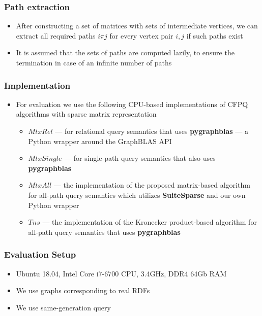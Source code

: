 \documentclass[xcolor=table,aspectratio=169]{beamer}
\begin{document}
\begin{frame}[fragile] \frametitle{Path extraction}

\begin{itemize}
	\item After constructing a set of matrices with sets of intermediate vertices, we can extract all required paths $i\pi j$ for every vertex pair $i, j$ if such paths exist
	\item It is	assumed that the sets of paths are computed lazily, to ensure the	termination in case of an infinite number of paths
	
\end{itemize}
\end{frame}


\begin{frame}[fragile] \frametitle{Implementation}

\begin{itemize}
	\item For evaluation we use the following CPU-based implementations of CFPQ algorithms with sparse matrix representation
	\begin{itemize}
		\item \textbf{$MtxRel$} --- for  relational query semantics that uses \textbf{pygraphblas} --- a Python wrapper around the GraphBLAS API
		\item \textbf{$MtxSingle$} --- for  single-path query semantics that also uses \textbf{pygraphblas}
		\item \textbf{$MtxAll$} --- the implementation of the proposed matrix-based algorithm for all-path query semantics which utilizes \textbf{SuiteSparse} and our own Python wrapper
		\item \textbf{$Tns$} --- the implementation of the Kronecker product-based algorithm for all-path query semantics that uses \textbf{pygraphblas}
		
	\end{itemize}
\end{itemize}
\end{frame}


\begin{frame} \frametitle{Evaluation Setup}
  \begin{itemize}
  	\item Ubuntu 18.04, Intel Core i7-6700 CPU, 3.4GHz, DDR4 64Gb RAM
  	\item We use graphs corresponding to real RDFs
  	\item We use same-generation query
  \end{itemize}
\end{frame}
\end{document}
